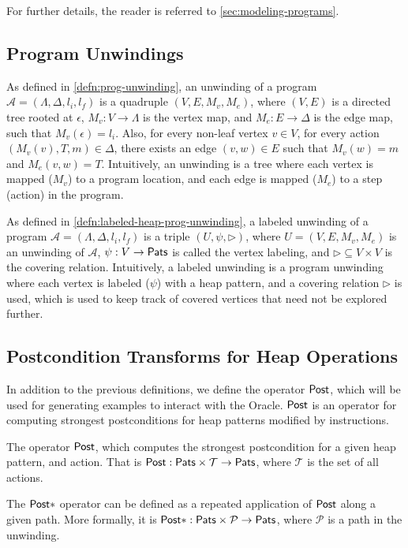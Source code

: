 For further details, the reader is referred to \autoref{sec:modeling-programs}.

\subsection{Program Unwindings}
As defined in \autoref{defn:prog-unwinding}, an unwinding of a program $\mathcal{A} = (\Lambda, \Delta, l_i, l_f)$ is a quadruple $(V, E, M_v, M_e)$, where $(V, E)$ is a directed tree rooted at $\epsilon$, $M_v : V \rightarrow \Lambda$ is the vertex map, and $M_e : E \rightarrow \Delta$ is the edge map, such that $M_v(\epsilon) = l_i$. Also, for every non-leaf vertex $v \in V$, for every action $(M_v(v), T, m) \in \Delta$, there exists an edge $(v,w) \in E$ such that $M_v(w) = m$ and $M_e(v,w) = T$. Intuitively, an unwinding is a tree where each vertex is mapped ($M_v$) to a program location, and each edge is mapped ($M_e$) to a step (action) in the program.

As defined in \autoref{defn:labeled-heap-prog-unwinding}, a labeled unwinding of a program $\mathcal{A} = (\Lambda, \Delta, l_i, l_f)$ is a triple $(U, \psi, \rhd)$, where $U = (V, E, M_v, M_e)$ is an unwinding of $\mathcal{A}$, $\psi : V \to \mathsf{Pats}$ is called the vertex labeling, and $\rhd \subseteq V \times V$ is the covering relation. Intuitively, a labeled unwinding is a program unwinding where each vertex is labeled ($\psi$) with a heap pattern, and a covering relation $\rhd$ is used, which is used to keep track of covered vertices that need not be explored further.

\subsection{Postcondition Transforms for Heap Operations}
In addition to the previous definitions, we define the operator $\mathsf{Post}$, which will be used for generating examples to interact with the Oracle. $\mathsf{Post}$ is an operator for computing strongest postconditions for heap patterns modified by \lang instructions.

\begin{defn}
  \label{defn:heap-post-transforms}
  The operator $\mathsf{Post}$, which computes the strongest postcondition for a given heap pattern, and action. That is $\mathsf{Post} : \mathsf{Pats} \times \mathcal{T} \to \mathsf{Pats}$, where $\mathcal{T}$ is the set of all actions.

  The $\mathsf{Post}{*}$ operator can be defined as a repeated application of $\mathsf{Post}$ along a given path. More formally, it is $\mathsf{Post}{*} : \mathsf{Pats} \times \mathcal{P} \to \mathsf{Pats}$, where $\mathcal{P}$ is a path in the unwinding.
\end{defn}

